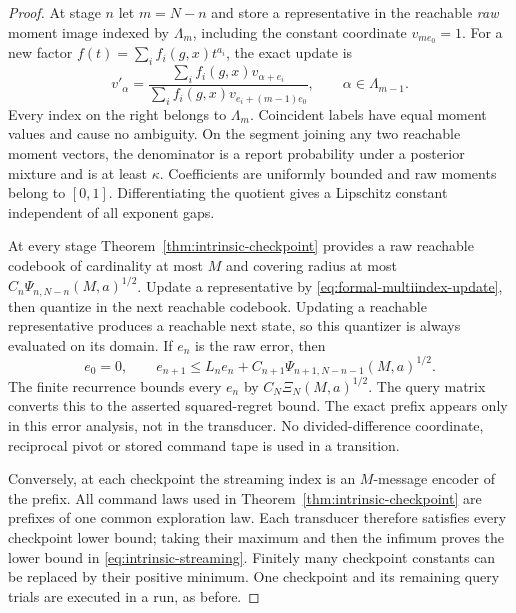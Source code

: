 \documentclass[11pt]{amsart}
\theoremstyle{definition}\newtheorem{definition}[theorem]{Definition}
\theoremstyle{remark}\newtheorem{remark}[theorem]{Remark}
\begin{document}
\begin{proof}
At stage $n$ let $m=N-n$ and store a representative in the reachable
\emph{raw} moment image indexed by $\Lambda_m$, including the constant
coordinate $v_{me_0}=1$. For a new factor
$f(t)=\sum_i f_i(g,x)t^{a_i}$, the exact update is
\begin{equation}\label{eq:formal-multiindex-update}
 v'_\alpha=
 \frac{\sum_i f_i(g,x)v_{\alpha+e_i}}
      {\sum_i f_i(g,x)v_{e_i+(m-1)e_0}},
 \qquad \alpha\in\Lambda_{m-1}.
\end{equation}
Every index on the right belongs to $\Lambda_m$. Coincident labels
have equal moment values and cause no ambiguity. On the segment joining
any two reachable moment vectors, the denominator is a report probability
under a posterior mixture and is at least $\kappa$. Coefficients are
uniformly bounded and raw moments belong to $[0,1]$. Differentiating the
quotient gives a Lipschitz constant independent of all exponent gaps.

At every stage Theorem~\ref{thm:intrinsic-checkpoint} provides a raw
reachable codebook of cardinality at most $M$ and covering radius at most
$C_n\Psi_{n,N-n}(M,a)^{1/2}$. Update a representative by
\eqref{eq:formal-multiindex-update}, then quantize in the next reachable
codebook. Updating a reachable representative produces a reachable next
state, so this quantizer is always evaluated on its domain. If $e_n$
is the raw error, then
\[
 e_0=0,\qquad e_{n+1}\le L_ne_n+
        C_{n+1}\Psi_{n+1,N-n-1}(M,a)^{1/2}.
\]
The finite recurrence bounds every $e_n$ by
$C_N\Xi_N(M,a)^{1/2}$. The query matrix converts this to the
asserted squared-regret bound. The exact prefix appears only in this
error analysis, not in the transducer. No divided-difference coordinate,
reciprocal pivot or stored command tape is used in a transition.

Conversely, at each checkpoint the streaming index is an $M$-message
encoder of the prefix. All command laws used in
Theorem~\ref{thm:intrinsic-checkpoint} are prefixes of one common
exploration law. Each transducer therefore satisfies every checkpoint
lower bound; taking their maximum and then the infimum proves the lower
bound in \eqref{eq:intrinsic-streaming}. Finitely many checkpoint
constants can be replaced by their positive minimum. One checkpoint
and its remaining query trials are executed in a run, as before.
\end{proof}
\end{document}
